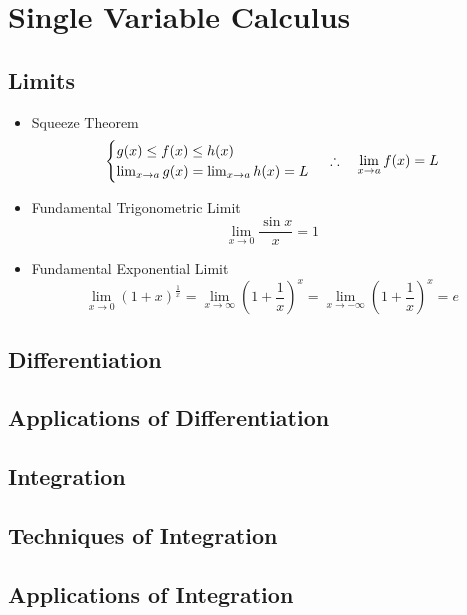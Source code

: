 \section{Single Variable Calculus}

\subsection{Limits}
	\begin{itemize}
		\item Squeeze Theorem
			\begin{equation}
				\begin{cases}
					g(x) \leq f(x) \leq h(x) \\
					\lim_{x \rightarrow a} g(x) = \lim_{x \rightarrow a} h(x) = L
				\end{cases} \\
				\therefore \quad \lim_{x \rightarrow a} f(x) = L
			\end{equation}
		\item Fundamental Trigonometric Limit
			\begin{equation}
				\lim_{x \rightarrow 0} \frac{\sin x}{x} = 1
			\end{equation}
		\item Fundamental Exponential Limit
			\begin{equation}
				\lim_{x \rightarrow 0} (1+x)^{\frac{1}{x}} = \lim_{x \rightarrow \infty} \left( 1+ \frac{1}{x} \right)^x = \lim_{x \rightarrow - \infty} \left( 1+ \frac{1}{x} \right)^x = e
			\end{equation}
	\end{itemize}
\subsection{Differentiation}
\subsection{Applications of Differentiation}
\subsection{Integration}
\subsection{Techniques of Integration}
\subsection{Applications of Integration}
